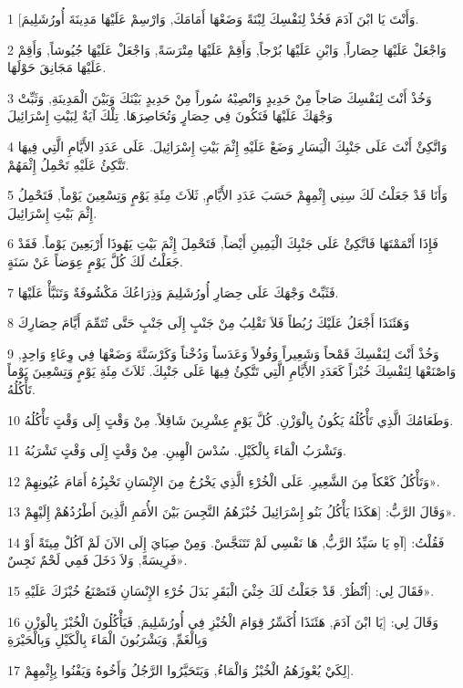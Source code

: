 \par 1 [وَأَنْتَ يَا ابْنَ آدَمَ فَخُذْ لِنَفْسِكَ لِبْنَةً وَضَعْهَا أَمَامَكَ, وَارْسِمْ عَلَيْهَا مَدِينَةَ أُورُشَلِيمَ.
\par 2 وَاجْعَلْ عَلَيْهَا حِصَاراً, وَابْنِ عَلَيْهَا بُرْجاً, وَأَقِمْ عَلَيْهَا مِتْرَسَةً, وَاجْعَلْ عَلَيْهَا جُيُوشاً, وَأَقِمْ عَلَيْهَا مَجَانِقَ حَوْلَهَا.
\par 3 وَخُذْ أَنْتَ لِنَفْسِكَ صَاجاً مِنْ حَدِيدٍ وَانْصِبْهُ سُوراً مِنْ حَدِيدٍ بَيْنَكَ وَبَيْنَ الْمَدِينَةِ, وَثَبِّتْ وَجْهَكَ عَلَيْهَا فَتَكُونَ فِي حِصَارٍ وَتُحَاصِرَهَا. تِلْكَ آيَةٌ لِبَيْتِ إِسْرَائِيلَ
\par 4 وَاتَّكِئْ أَنْتَ عَلَى جَنْبِكَ الْيَسَارِ وَضَعْ عَلَيْهِ إِثْمَ بَيْتِ إِسْرَائِيلَ. عَلَى عَدَدِ الأَيَّامِ الَّتِي فِيهَا تَتَّكِئُ عَلَيْهِ تَحْمِلُ إِثْمَهُمْ.
\par 5 وَأَنَا قَدْ جَعَلْتُ لَكَ سِنِي إِثْمِهِمْ حَسَبَ عَدَدِ الأَيَّامِ, ثَلاَثَ مِئَةِ يَوْمٍ وَتِسْعِينَ يَوْماً, فَتَحْمِلُ إِثْمَ بَيْتِ إِسْرَائِيلَ.
\par 6 فَإِذَا أَتْمَمْتَهَا فَاتَّكِئْ عَلَى جَنْبِكَ الْيَمِينِ أَيْضاً, فَتَحْمِلَ إِثْمَ بَيْتِ يَهُوذَا أَرْبَعِينَ يَوْماً. فَقَدْ جَعَلْتُ لَكَ كُلَّ يَوْمٍ عِوَضاً عَنْ سَنَةٍ.
\par 7 فَثَبِّتْ وَجْهَكَ عَلَى حِصَارِ أُورُشَلِيمَ وَذِرَاعُكَ مَكْشُوفَةٌ وَتَنَبَّأْ عَلَيْهَا.
\par 8 وَهَئَنَذَا أَجْعَلُ عَلَيْكَ رُبُطاً فَلاَ تَقْلِبُ مِنْ جَنْبٍ إِلَى جَنْبٍ حَتَّى تُتَمِّمَ أَيَّامَ حِصَارِكَ
\par 9 وَخُذْ أَنْتَ لِنَفْسِكَ قَمْحاً وَشَعِيراً وَفُولاً وَعَدَساً وَدُخْناً وَكَرْسَنَّةَ وَضَعْهَا فِي وِعَاءٍ وَاحِدٍ, وَاصْنَعْهَا لِنَفْسِكَ خُبْزاً كَعَدَدِ الأَيَّامِ الَّتِي تَتَّكِئُ فِيهَا عَلَى جَنْبِكَ. ثَلاَثَ مِئَةِ يَوْمٍ وَتِسْعِينَ يَوْماً تَأْكُلُهُ.
\par 10 وَطَعَامُكَ الَّذِي تَأْكُلُهُ يَكُونُ بِالْوَزْنِ. كُلَّ يَوْمٍ عِشْرِينَ شَاقِلاً. مِنْ وَقْتٍ إِلَى وَقْتٍ تَأْكُلُهُ.
\par 11 وَتَشْرَبُ الْمَاءَ بِالْكَيْلِ. سُدْسَ الْهِينِ. مِنْ وَقْتٍ إِلَى وَقْتٍ تَشْرَبُهُ.
\par 12 وَتَأْكُلُ كَعْكاً مِنَ الشَّعِيرِ. عَلَى الْخُرْءِ الَّذِي يَخْرُجُ مِنَ الإِنْسَانِ تَخْبِزُهُ أَمَامَ عُيُونِهِمْ».
\par 13 وَقَالَ الرَّبُّ: [هَكَذَا يَأْكُلُ بَنُو إِسْرَائِيلَ خُبْزَهُمُ النَّجِسَ بَيْنَ الأُمَمِ الَّذِينَ أَطْرُدُهُمْ إِلَيْهِمْ».
\par 14 فَقُلْتُ: [آهِ يَا سَيِّدُ الرَّبُّ, هَا نَفْسِي لَمْ تَتَنَجَّسْ. وَمِنْ صِبَايَ إِلَى الآنَ لَمْ آكُلْ مِيتَةً أَوْ فَرِيسَةً, وَلاَ دَخَلَ فَمِي لَحْمٌ نَجِسٌ».
\par 15 فَقَالَ لِي: [اُنْظُرْ. قَدْ جَعَلْتُ لَكَ خِثْيَ الْبَقَرِ بَدَلَ خُرْءِ الإِنْسَانِ فَتَصْنَعُ خُبْزَكَ عَلَيْهِ».
\par 16 وَقَالَ لِي: [يَا ابْنَ آدَمَ, هَئَنَذَا أُكَسِّرُ قِوَامَ الْخُبْزِ فِي أُورُشَلِيمَ, فَيَأْكُلُونَ الْخُبْزَ بِالْوَزْنِ وَبِالْغَمِّ, وَيَشْرَبُونَ الْمَاءَ بِالْكَيْلِ وَبِالْحَيْرَةِ
\par 17 لِكَيْ يُعْوِزَهُمُ الْخُبْزُ وَالْمَاءُ, وَيَتَحَيَّرُوا الرَّجُلُ وَأَخُوهُ وَيَفْنُوا بِإِثْمِهِمْ].

